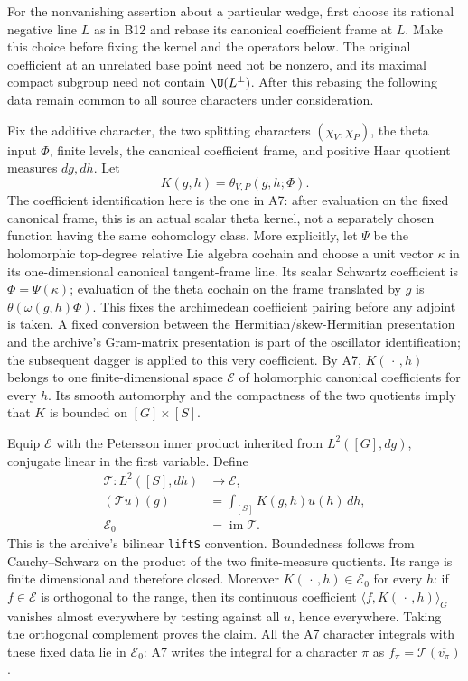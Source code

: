 \documentclass[11pt]{article}
\theoremstyle{definition}\newtheorem{definition}[theorem]{Definition}\newtheorem{remark}[theorem]{Remark}
\begin{document}
For the nonvanishing assertion about a particular wedge, first
choose its rational negative line $L$ as in B12 and rebase its
canonical coefficient frame at $L$. Make this choice before
fixing the kernel and the operators below. The original
coefficient at an unrelated base point need not be nonzero,
and its maximal compact subgroup need not contain $\U(L^\perp)$.
After this rebasing the following data remain common to all
source characters under consideration.

Fix the additive character, the two splitting characters
$(\chi_V,\chi_P)$, the theta input $\Phi$, finite levels, the
canonical coefficient frame, and positive Haar quotient measures
$dg,dh$. Let
\[
 K(g,h)=\theta_{V,P}(g,h;\Phi).
\]
The coefficient identification here is the one in A7: after
evaluation on the fixed canonical frame, this is an actual scalar
theta kernel, not a separately chosen function having the same
cohomology class. More explicitly, let $\Psi$ be the holomorphic
top-degree relative Lie algebra cochain and choose a unit vector
$\kappa$ in its one-dimensional canonical tangent-frame line.
Its scalar Schwartz coefficient is $\Phi=\Psi(\kappa)$; evaluation
of the theta cochain on the frame translated by $g$ is
$\theta(\omega(g,h)\Phi)$. This fixes the archimedean coefficient
pairing before any adjoint is taken. A fixed conversion between
the Hermitian/skew-Hermitian presentation and the archive's
Gram-matrix presentation is part of the oscillator identification;
the subsequent dagger is applied to this very coefficient.
By A7, $K(\,\cdot\,,h)$ belongs to one
finite-dimensional space $\mathcal E$ of holomorphic canonical
coefficients for every $h$. Its smooth automorphy and the
compactness of the two quotients imply that $K$ is bounded on
$[G]\times[S]$.

Equip $\mathcal E$ with the Petersson inner product inherited from
$L^2([G],dg)$, conjugate linear in the first variable. Define
\begin{equation}
\begin{aligned}
 \mathcal T:L^2([S],dh)&\longrightarrow\mathcal E,\\
 (\mathcal T u)(g)&=\int_{[S]}K(g,h)u(h)\,dh,\\
 \mathcal E_0&=\operatorname{im}\mathcal T.
\end{aligned}
\tag{B17a}
\end{equation}
This is the archive's bilinear \texttt{liftS} convention. Boundedness
follows from Cauchy--Schwarz on the product of the two finite-measure
quotients. Its range is finite dimensional and therefore closed.
Moreover $K(\,\cdot\,,h)\in\mathcal E_0$ for every $h$:
if $f\in\mathcal E$ is orthogonal to the range, then its
continuous coefficient $\langle f,K(\,\cdot\,,h)\rangle_G$
vanishes almost everywhere by testing against all $u$, hence
everywhere. Taking the orthogonal complement proves the claim.
All the A7 character integrals with these fixed data lie in
$\mathcal E_0$: A7 writes the integral for a character $\pi$ as
$f_\pi=\mathcal T(\overline{v_\pi})$.
\end{document}
